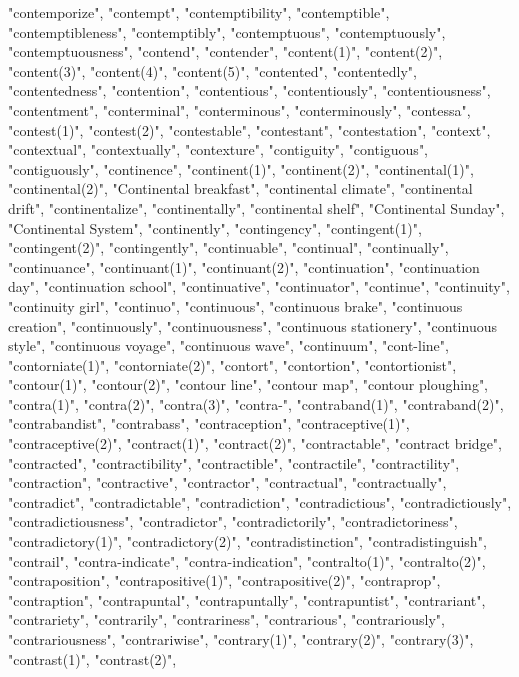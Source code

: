 "contemporize",
"contempt",
"contemptibility",
"contemptible",
"contemptibleness",
"contemptibly",
"contemptuous",
"contemptuously",
"contemptuousness",
"contend",
"contender",
"content(1)",
"content(2)",
"content(3)",
"content(4)",
"content(5)",
"contented",
"contentedly",
"contentedness",
"contention",
"contentious",
"contentiously",
"contentiousness",
"contentment",
"conterminal",
"conterminous",
"conterminously",
"contessa",
"contest(1)",
"contest(2)",
"contestable",
"contestant",
"contestation",
"context",
"contextual",
"contextually",
"contexture",
"contiguity",
"contiguous",
"contiguously",
"continence",
"continent(1)",
"continent(2)",
"continental(1)",
"continental(2)",
"Continental breakfast",
"continental climate",
"continental drift",
"continentalize",
"continentally",
"continental shelf",
"Continental Sunday",
"Continental System",
"continently",
"contingency",
"contingent(1)",
"contingent(2)",
"contingently",
"continuable",
"continual",
"continually",
"continuance",
"continuant(1)",
"continuant(2)",
"continuation",
"continuation day",
"continuation school",
"continuative",
"continuator",
"continue",
"continuity",
"continuity girl",
"continuo",
"continuous",
"continuous brake",
"continuous creation",
"continuously",
"continuousness",
"continuous stationery",
"continuous style",
"continuous voyage",
"continuous wave",
"continuum",
"cont-line",
"contorniate(1)",
"contorniate(2)",
"contort",
"contortion",
"contortionist",
"contour(1)",
"contour(2)",
"contour line",
"contour map",
"contour ploughing",
"contra(1)",
"contra(2)",
"contra(3)",
"contra-",
"contraband(1)",
"contraband(2)",
"contrabandist",
"contrabass",
"contraception",
"contraceptive(1)",
"contraceptive(2)",
"contract(1)",
"contract(2)",
"contractable",
"contract bridge",
"contracted",
"contractibility",
"contractible",
"contractile",
"contractility",
"contraction",
"contractive",
"contractor",
"contractual",
"contractually",
"contradict",
"contradictable",
"contradiction",
"contradictious",
"contradictiously",
"contradictiousness",
"contradictor",
"contradictorily",
"contradictoriness",
"contradictory(1)",
"contradictory(2)",
"contradistinction",
"contradistinguish",
"contrail",
"contra-indicate",
"contra-indication",
"contralto(1)",
"contralto(2)",
"contraposition",
"contrapositive(1)",
"contrapositive(2)",
"contraprop",
"contraption",
"contrapuntal",
"contrapuntally",
"contrapuntist",
"contrariant",
"contrariety",
"contrarily",
"contrariness",
"contrarious",
"contrariously",
"contrariousness",
"contrariwise",
"contrary(1)",
"contrary(2)",
"contrary(3)",
"contrast(1)",
"contrast(2)",
